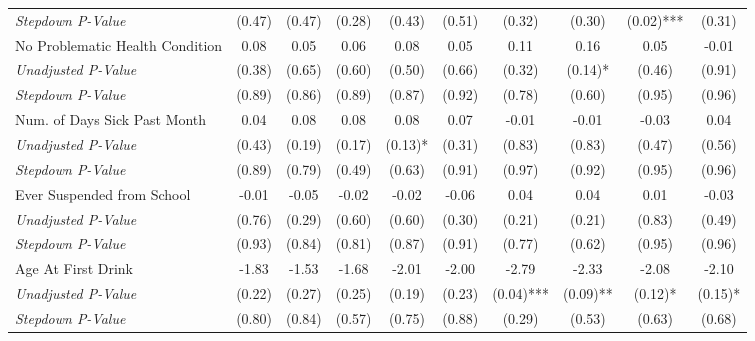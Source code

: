 \begin{tabular}{l c c c c c c c c c}
\quad \textit{Stepdown P-Value} & (0.47) & (0.47) & (0.28) & (0.43) & (0.51) & (0.32) & (0.30) & (0.02)*** & (0.31) \\
No Problematic Health Condition & 0.08 & 0.05 & 0.06 & 0.08 & 0.05 & 0.11 & 0.16 & 0.05 & -0.01 \\
\quad \textit{Unadjusted P-Value} & (0.38) & (0.65) & (0.60) & (0.50) & (0.66) & (0.32) & (0.14)* & (0.46) & (0.91) \\
\quad \textit{Stepdown P-Value} & (0.89) & (0.86) & (0.89) & (0.87) & (0.92) & (0.78) & (0.60) & (0.95) & (0.96) \\
Num. of Days Sick Past Month & 0.04 & 0.08 & 0.08 & 0.08 & 0.07 & -0.01 & -0.01 & -0.03 & 0.04 \\
\quad \textit{Unadjusted P-Value} & (0.43) & (0.19) & (0.17) & (0.13)* & (0.31) & (0.83) & (0.83) & (0.47) & (0.56) \\
\quad \textit{Stepdown P-Value} & (0.89) & (0.79) & (0.49) & (0.63) & (0.91) & (0.97) & (0.92) & (0.95) & (0.96) \\
Ever Suspended from School & -0.01 & -0.05 & -0.02 & -0.02 & -0.06 & 0.04 & 0.04 & 0.01 & -0.03 \\
\quad \textit{Unadjusted P-Value} & (0.76) & (0.29) & (0.60) & (0.60) & (0.30) & (0.21) & (0.21) & (0.83) & (0.49) \\
\quad \textit{Stepdown P-Value} & (0.93) & (0.84) & (0.81) & (0.87) & (0.91) & (0.77) & (0.62) & (0.95) & (0.96) \\
Age At First Drink & -1.83 & -1.53 & -1.68 & -2.01 & -2.00 & -2.79 & -2.33 & -2.08 & -2.10 \\
\quad \textit{Unadjusted P-Value} & (0.22) & (0.27) & (0.25) & (0.19) & (0.23) & (0.04)*** & (0.09)** & (0.12)* & (0.15)* \\
\quad \textit{Stepdown P-Value} & (0.80) & (0.84) & (0.57) & (0.75) & (0.88) & (0.29) & (0.53) & (0.63) & (0.68) \\
\bottomrule
\end{tabular}
